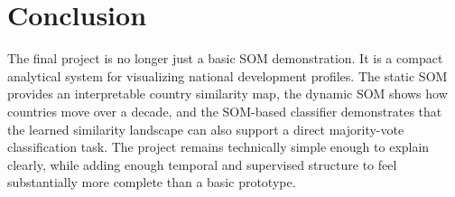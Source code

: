 \documentclass[11pt,a4paper]{article}
\begin{document}
\section{Conclusion}

The final project is no longer just a basic SOM demonstration. It is a compact analytical system for visualizing national development profiles. The static SOM provides an interpretable country similarity map, the dynamic SOM shows how countries move over a decade, and the SOM-based classifier demonstrates that the learned similarity landscape can also support a direct majority-vote classification task. The project remains technically simple enough to explain clearly, while adding enough temporal and supervised structure to feel substantially more complete than a basic prototype.
\end{document}
